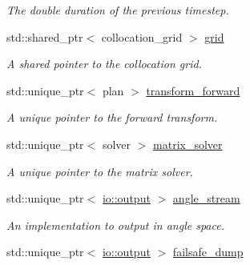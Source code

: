 \begin{DoxyCompactItemize}
\begin{DoxyCompactList}\small\item\em The double duration of the previous timestep. \end{DoxyCompactList}\item 
\hypertarget{classbases_1_1element_a0be44a6a3cef50bf30850759c9c1f433}{std\-::shared\-\_\-ptr$<$ collocation\-\_\-grid $>$ \hyperlink{classbases_1_1element_a0be44a6a3cef50bf30850759c9c1f433}{grid}}\label{classbases_1_1element_a0be44a6a3cef50bf30850759c9c1f433}

\begin{DoxyCompactList}\small\item\em A shared pointer to the collocation grid. \end{DoxyCompactList}\item 
\hypertarget{classbases_1_1element_ab361d0ea13c2a7a687989bd752d5e5bb}{std\-::unique\-\_\-ptr$<$ plan $>$ \hyperlink{classbases_1_1element_ab361d0ea13c2a7a687989bd752d5e5bb}{transform\-\_\-forward}}\label{classbases_1_1element_ab361d0ea13c2a7a687989bd752d5e5bb}

\begin{DoxyCompactList}\small\item\em A unique pointer to the forward transform. \end{DoxyCompactList}\item 
\hypertarget{classbases_1_1element_ac35b7d212d08c6f520285bed97311d1f}{std\-::unique\-\_\-ptr$<$ solver $>$ \hyperlink{classbases_1_1element_ac35b7d212d08c6f520285bed97311d1f}{matrix\-\_\-solver}}\label{classbases_1_1element_ac35b7d212d08c6f520285bed97311d1f}

\begin{DoxyCompactList}\small\item\em A unique pointer to the matrix solver. \end{DoxyCompactList}\item 
\hypertarget{classbases_1_1element_ad954d7448518632c3e8872334de13be1}{std\-::unique\-\_\-ptr$<$ \hyperlink{classio_1_1output}{io\-::output} $>$ \hyperlink{classbases_1_1element_ad954d7448518632c3e8872334de13be1}{angle\-\_\-stream}}\label{classbases_1_1element_ad954d7448518632c3e8872334de13be1}

\begin{DoxyCompactList}\small\item\em An implementation to output in angle space. \end{DoxyCompactList}\item 
\hypertarget{classbases_1_1element_a37264602a9fadc22ffdaa5d08769c573}{std\-::unique\-\_\-ptr$<$ \hyperlink{classio_1_1output}{io\-::output} $>$ \hyperlink{classbases_1_1element_a37264602a9fadc22ffdaa5d08769c573}{failsafe\-\_\-dump}}\label{classbases_1_1element_a37264602a9fadc22ffdaa5d08769c573}


\end{DoxyCompactItemize}
